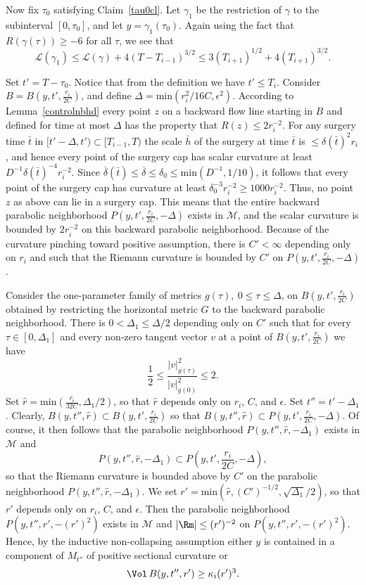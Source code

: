 Now fix $\tau_0$ satisfying Claim~\ref{tau0cl}.
 Let $\gamma_1$ be the
restriction of $\gamma$ to the subinterval $[0,\tau_0]$, and let
$y=\gamma_1(\tau_0)$. Again using the fact that $R(\gamma(\tau))\ge
-6$ for all $\tau$, we see that
\begin{equation}\label{Lgamma1}
{\mathcal L}(\gamma_1)\le {\mathcal L}(\gamma)+4(T-T_{i-1})^{3/2}\le
3(T_{i+1})^{1/2}+4(T_{i+1})^{3/2}.\end{equation}


Set $t'=T-\tau_0$. Notice that from the definition we
have $t'\le T_i$. Consider $B=B(y,t',\frac{r_i}{2C})$, and
define $\Delta=\mathrm{min}(r_i^2/16C,\epsilon^2)$. According to
Lemma~\ref{controlnbhd} every point $z$ on a backward flow line
starting in $B$ and defined for time at most $ \Delta$  has the
property that $R(z)\le 2r_i^{-2}$. For any surgery time $\bar t$ in
$[t'-\Delta,t')\subset [T_{i-1},T)$ the scale $\bar h$ of the
surgery at time $\bar t$ is $\le \delta(\bar t)^2 r_i$, and hence
every point of the surgery cap has scalar curvature at least
$D^{-1}\delta(\bar t)^{-4}r_i^{-2}$. Since $\overline\delta(\bar t)\le
\overline \delta\le \delta_0\le \mathrm{min}(D^{-1},1/10)$, it follows
that every point of the surgery cap has curvature at least
$\delta_0^{-3}r_i^{-2}\ge 1000r_i^{-2}$. Thus,
 no point
$z$ as above can lie in a surgery cap. This means that the entire
backward parabolic neighborhood $P(y,t',\frac{r_i}{2C},-\Delta)$
exists in ${\mathcal M}$, and the scalar curvature is bounded by $2
r_i^{-2}$ on this backward parabolic neighborhood. Because of the
curvature pinching toward positive assumption, there is $C'<\infty$
depending only on $r_i$ and such that the Riemann curvature is
bounded by $C'$ on $P(y,t',\frac{r_i}{2C},-\Delta)$.


Consider the one-parameter family of metrics $g(\tau),\ 0\le \tau\le
\Delta$, on $B(y,t',\frac{r_i}{2C})$ obtained by restricting the
horizontal metric $G$ to the backward parabolic neighborhood.
There is $0<\Delta_1\le \Delta /2$
depending only on $C'$ such that for every $\tau\in [0,\Delta_1]$ and
every non-zero tangent vector $v$ at a point of
$B(y,t',\frac{r_i}{2C})$ we have
$$\frac{1}{2}\le \frac{|v|^2_{g(\tau)}}{|v|^2_{g(0)}}\le 2.$$
Set $\hat r=\mathrm{min}(\frac{r_i}{32C},\Delta_1/2)$, so that $\hat r$ depends
only on $r_i$, $C$, and $\epsilon$. Set $t''=t'-\Delta_1$. Clearly,
$B(y, t'',\hat r)\subset B(y,t',\frac{r_i}{2C})$ so that $B(y,t'',\hat r)\subset
P(y,t',\frac{r_i}{2C},-\Delta)$. Of course, it then follows that the parabolic neighborhood
$P(y,t'',\hat r,-\Delta_1)$ exists in ${\mathcal M}$ and
$$P(y,t'',\hat r,-\Delta_1)\subset P(y,t',\frac{r_i}{2 C},-\Delta),$$ so that the
Riemann curvature is bounded above by $C'$ on the parabolic
neighborhood $P(y,t'',\hat r,-\Delta_1)$. We set $r'=\mathrm{min}(\hat r,(C')^{-1/2},\sqrt{\Delta_1}/2)$, so that $r'$ depends only on
$r_i$, $C$, and $\epsilon$. Then  the parabolic neighborhood
$P(y,t'',r',-(r')^2)$ exists in ${\mathcal M}$ and $|\Rm|\le
(r')^{-2}$ on $P(y,t'',r',-(r')^2)$. Hence, by the inductive
non-collapsing assumption either $y$ is contained in a component of $M_{t''}$ of positive sectional curvature or
$$\Vol\,B(y,t'',r')\ge
\kappa_i(r')^3.$$


